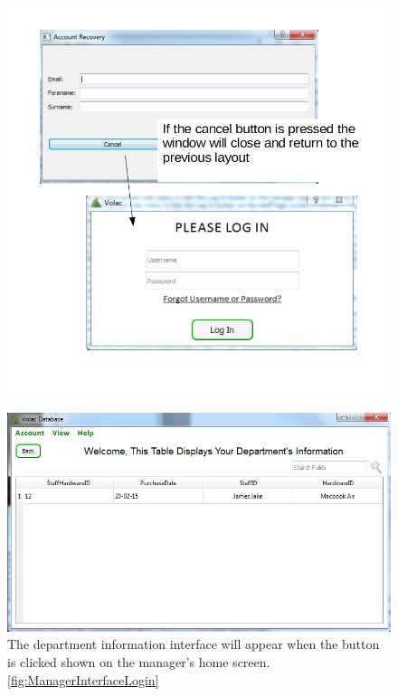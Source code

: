 \begin{figure}[H]
    \includegraphics[width=\textwidth]{./Testing/Images/FogottenPasswordClose.png}
     \label{fig:FogottenPasswordClose}
\end{figure}

\begin{figure}[H]
    \includegraphics[width=\textwidth]{./Testing/Images/DepartmentInformation.png}
    \caption{The department information interface will appear when the button is clicked shown on the manager's home screen. \ref{fig:ManagerInterfaceLogin} } \label{fig:DepartmentInformation}
\end{figure}

